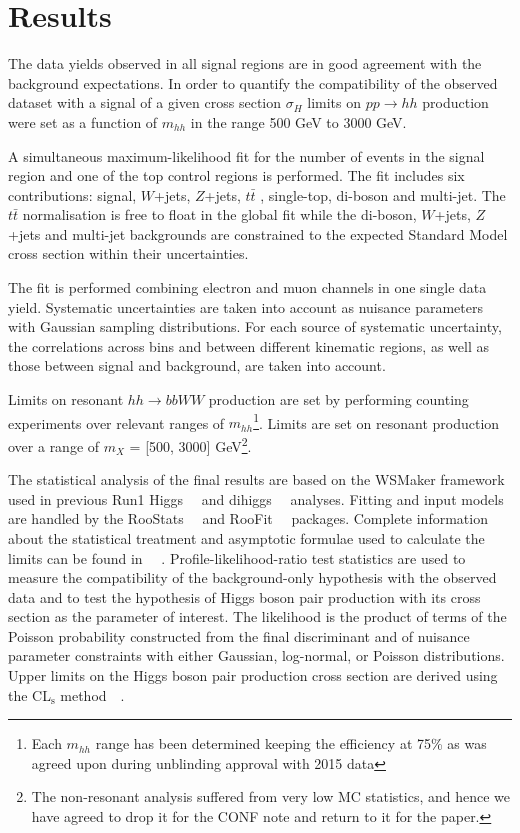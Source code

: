 \section{Results}
\label{sec:dihiggs_result}

The data yields observed in all
signal regions are in good agreement with the background
expectations. In order to quantify the compatibility of the observed
dataset with a signal of a given cross section $\sigma_{H}$ limits on
$pp \to hh$  production were set as a function of  $m_{hh}$ in the
range 500 GeV to 3000 GeV.

A simultaneous maximum-likelihood fit for the number of events
in the signal region and one of the top control regions is performed. The fit
includes six contributions: signal, $W$+jets, $Z$+jets, $t\bar{t}$ ,
single-top, di-boson and multi-jet. The $t\bar{t}$ normalisation is free to float in
the global fit while the di-boson, $W$+jets, $Z$+jets and multi-jet
backgrounds are constrained to the expected Standard Model cross
section within their uncertainties.

The fit is performed combining  electron and muon
channels in one single data yield. Systematic uncertainties are taken into account as nuisance
parameters with Gaussian sampling distributions. For each source of
systematic uncertainty, the correlations across bins and between
different kinematic regions, as well as those between signal and
background, are taken into account. 

Limits on resonant $hh\rightarrow bbWW$ production are set by performing
counting experiments over relevant ranges of $m_{hh}$\footnote{Each $m_{hh}$
range has been determined keeping the efficiency at 75\% as was agreed upon
during unblinding approval with 2015 data}. Limits are set on resonant
production over a range of $m_X$ = [500, 3000] GeV{\footnote{The non-resonant analysis suffered from very low MC statistics, and hence we have agreed to drop it for the CONF note and return to it for the paper.}}.

The statistical analysis of the final results are based on the WSMaker
framework used in previous Run1 Higgs~~\cite{Aad:2012an} and
dihiggs~~\cite{Aad:2052848} analyses. Fitting and input models are handled
by the RooStats~~\cite{2010acat.confE..57M} and
RooFit~~\cite{2003physics...6116V} packages. Complete information about
the statistical treatment and asymptotic formulae used to calculate the
limits can be found in ~~\cite{Cowan:2010js}. Profile-likelihood-ratio test
statistics are used to measure the compatibility of the background-only
hypothesis with the observed data and to test the hypothesis of Higgs
boson pair production with its cross section as the parameter of interest.
The likelihood is the product of terms of the Poisson probability
constructed from the final discriminant and of nuisance parameter
constraints with either Gaussian, log-normal, or Poisson distributions.
Upper limits on the Higgs boson pair production cross section are derived
using the CL$_\text{s}$ method~~\cite{0954-3899-28-10-313}.

